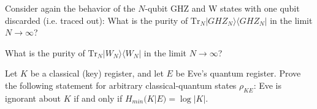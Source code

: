 \documentclass[a4paper,10pt,landscape,twocolumn]{scrartcl}
\newcommand{\ket}[1]{| #1 \rangle}
\newcommand{\bra}[1]{\langle #1 |}
\newcommand{\Tr}{\text{Tr}}
\begin{document}
\begin{exercise}
\begin{subex}
Consider again the behavior of the $N$-qubit GHZ and W states with one qubit discarded (i.e. traced out): What is the purity of $\Tr_N \ket{GHZ_N}\bra{GHZ_N}$ in the limit $N\rightarrow \infty$?
\end{subex}

\begin{subex}
What is the purity of $\Tr_N \ket{W_N}\bra{W_N}$ in the limit $N\rightarrow \infty$?
\end{subex}

\end{exercise}

\begin{exercise}
	Let $K$ be a classical (key) register, and let $E$ be Eve's quantum register. Prove the following statement for arbitrary classical-quantum states $\rho_{KE}$: Eve is ignorant about $K$ if and only if $H_{min}(K|E) = \log|K|$.
\end{exercise}
\end{document}
